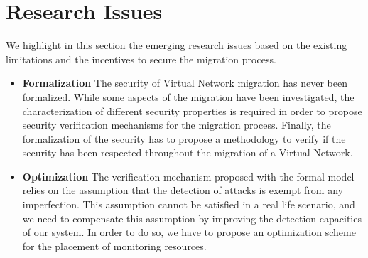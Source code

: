 \section{Research Issues}
We highlight in this section the emerging research issues based on the existing limitations and the incentives to secure the migration process. 

\begin{itemize}
    \item \textbf{Formalization } The security of Virtual Network migration has never been formalized. While some aspects of the migration have been investigated, the characterization of different security properties is required in order to propose security verification mechanisms for the migration process.
    Finally, the formalization of the security has to propose a methodology to verify if the security has been respected throughout the migration of a Virtual Network. 

    \item \textbf{Optimization} The verification mechanism proposed with the formal model relies on the assumption that the detection of attacks is exempt from any imperfection. This assumption cannot be satisfied in a real life scenario, and we need to compensate this assumption by improving the detection capacities of our system.
    In order to do so, we have to propose an optimization scheme for the placement of monitoring resources.
    
    
\end{itemize}

